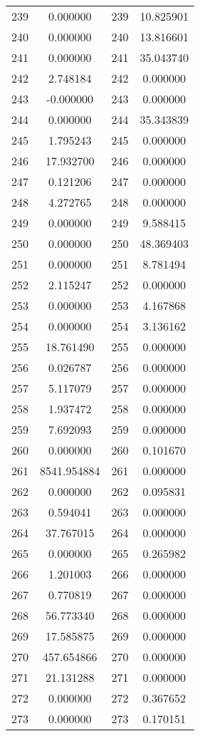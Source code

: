 \documentclass[12pt]{article}
\begin{document}
\begin{longtable}{@{}cccc@{}}
239 & 0.000000 & 239 & 10.825901 \\
240 & 0.000000 & 240 & 13.816601 \\
241 & 0.000000 & 241 & 35.043740 \\
242 & 2.748184 & 242 & 0.000000 \\
243 & -0.000000 & 243 & 0.000000 \\
244 & 0.000000 & 244 & 35.343839 \\
245 & 1.795243 & 245 & 0.000000 \\
246 & 17.932700 & 246 & 0.000000 \\
247 & 0.121206 & 247 & 0.000000 \\
248 & 4.272765 & 248 & 0.000000 \\
249 & 0.000000 & 249 & 9.588415 \\
250 & 0.000000 & 250 & 48.369403 \\
251 & 0.000000 & 251 & 8.781494 \\
252 & 2.115247 & 252 & 0.000000 \\
253 & 0.000000 & 253 & 4.167868 \\
254 & 0.000000 & 254 & 3.136162 \\
255 & 18.761490 & 255 & 0.000000 \\
256 & 0.026787 & 256 & 0.000000 \\
257 & 5.117079 & 257 & 0.000000 \\
258 & 1.937472 & 258 & 0.000000 \\
259 & 7.692093 & 259 & 0.000000 \\
260 & 0.000000 & 260 & 0.101670 \\
261 & 8541.954884 & 261 & 0.000000 \\
262 & 0.000000 & 262 & 0.095831 \\
263 & 0.594041 & 263 & 0.000000 \\
264 & 37.767015 & 264 & 0.000000 \\
265 & 0.000000 & 265 & 0.265982 \\
266 & 1.201003 & 266 & 0.000000 \\
267 & 0.770819 & 267 & 0.000000 \\
268 & 56.773340 & 268 & 0.000000 \\
269 & 17.585875 & 269 & 0.000000 \\
270 & 457.654866 & 270 & 0.000000 \\
271 & 21.131288 & 271 & 0.000000 \\
272 & 0.000000 & 272 & 0.367652 \\
273 & 0.000000 & 273 & 0.170151 \\

\end{longtable}
\end{document}
